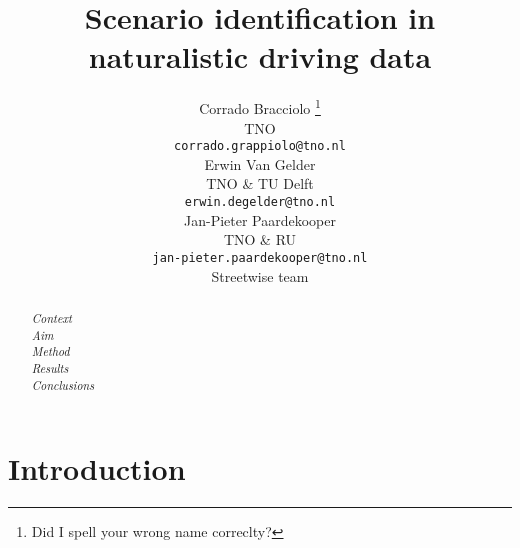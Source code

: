 \documentclass{article}
\title{Scenario identification in naturalistic driving data}
\author{
  Corrado Bracciolo \thanks{Did I spell your wrong name correclty?} \\
  TNO \\
  \texttt{corrado.grappiolo@tno.nl} \\
   \And
 Erwin Van Gelder \\
  TNO \& TU Delft \\
  \texttt{erwin.degelder@tno.nl} \\
   \AND
   Jan-Pieter Paardekooper \\
   TNO \& RU \\
   \texttt{jan-pieter.paardekooper@tno.nl} \\
  \And
  Streetwise team \\
}
\begin{document}
\maketitle

\begin{abstract}
\textit{Context}\\
\textit{Aim}\\
\textit{Method}\\
\textit{Results}\\
\textit{Conclusions}
\end{abstract}




\section{Introduction}




  
 
\end{document}
